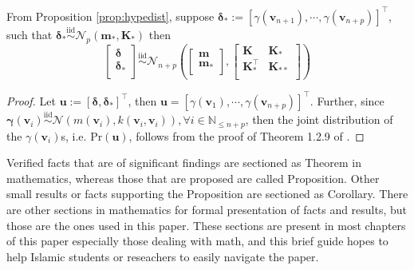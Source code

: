 \begin{prop}\label{prop:jointpdf-1}
    From Proposition \ref{prop:hypedist}, suppose $\boldsymbol{\delta}_{*}:=[\gamma(\mathbf{v}_{n+1}),\cdots,\gamma(\mathbf{v}_{n+p})]^{\top}$, such that $\boldsymbol{\delta}_{*}\overset{\mathrm{iid}}{\sim}\mathcal{N}_p(\mathbf{m}_*,\mathbf{K}_*)$ then 
    \begin{equation}
        \left[
        \begin{matrix}
            \boldsymbol{\delta}\\
            \boldsymbol{\delta}_{*}\\
        \end{matrix}
        \right]\overset{\mathrm{iid}}{\sim}
        \mathcal{N}_{n+p}\left(\left[
        \begin{matrix}
            \mathbf{m}\\
            \mathbf{m}_{*}\\
        \end{matrix}
        \right],\left[
        \begin{matrix}
            \mathbf{K}&\mathbf{K}_{*}\\
            \mathbf{K}_{*}^{\top}&\mathbf{K}_{**}\\
        \end{matrix}
        \right]\right)
    \end{equation}
\end{prop}
\begin{proof}
    Let $\mathbf{u}:=[\boldsymbol{\delta},\boldsymbol{\delta}_{*}]^{\top}$, then $\mathbf{u}=[\gamma(\mathbf{v}_1),\cdots,\gamma(\mathbf{v}_{n+p})]^{\top}$. Further, since $\mathbf{\gamma}(\mathbf{v}_i)\overset{\mathrm{iid}}{\sim}\mathcal{N}(m(\mathbf{v}_i),k(\mathbf{v}_i,\mathbf{v}_i)),\forall i\in\mathbb{N}_{\leq n+p}$, then the joint distribution of the $\gamma(\mathbf{v}_i)$s, i.e. $\mathrm{Pr}(\mathbf{u})$, follows from the proof of Theorem 1.2.9 of .
\end{proof}
Verified facts that are of significant findings are sectioned as Theorem in mathematics, whereas those that are proposed are called Proposition. Other small results or facts supporting the Proposition are sectioned as Corollary. There are other sections in mathematics for formal presentation of facts and results, but those are the ones used in this paper. These sections are present in most chapters of this paper especially those dealing with math, and this brief guide hopes to help Islamic students or reseachers to easily navigate the paper.